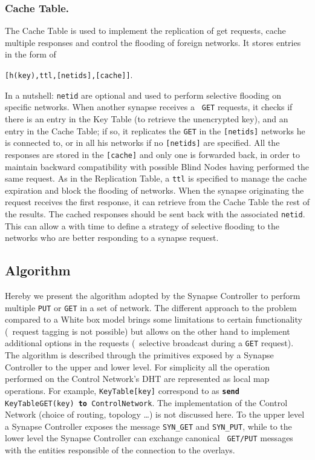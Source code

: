 \subsubsection{Cache Table.}
%
The Cache Table is used to implement the replication of get requests,
cache multiple responses and control the flooding of foreign networks.
It stores entries in the form of
%
\begin{center} 
{\tt[h(key),ttl,[netids],[cache]]}.
\end{center}
%
In a nutshell: {\tt netid} are optional and used to perform selective
flooding on specific networks.  When another synapse receives a {\tt
  GET} requests, it checks if there is an entry in the Key Table (to
retrieve the unencrypted key), and an entry in the Cache Table; if so,
it replicates the {\tt GET} in the {\tt [netids]} networks he is
connected to, or in all his networks if no {\tt [netids]} are
specified. All the responses are stored in the {\tt [cache]} and only
one is forwarded back, in order to maintain backward compatibility
with possible Blind Nodes having performed the same request. As in the
Replication Table, a {\tt ttl} is specified to manage the cache
expiration and block the flooding of networks.  When the synapse
originating the request receives the first response, it can retrieve
from the Cache Table the rest of the results.  The cached responses
should be sent back with the associated {\tt netid}. This can allow a
with time to define a strategy of selective flooding to the networks
who are better responding to a synapse request.

\subsection{Algorithm}
%
Hereby we present the algorithm adopted by the Synapse Controller to
perform multiple {\tt PUT} or {\tt GET} in a set of network.  The
different approach to the problem compared to a White box model brings
some limitations to certain functionality (\eg\ request tagging is not
possible) but allows on the other hand to implement additional options
in the requests (\eg\ selective broadcast during a {\tt GET} request).
The algorithm is described through the primitives exposed by a Synapse
Controller to the upper and lower level.  For simplicity all the
operation performed on the Control Network's DHT are represented as
local map operations.  For example, {\tt KeyTable[key]} correspond to
as {\tt {\bf send} KeyTableGET(key) {\bf to} ControlNetwork}.  The
implementation of the Control Network (choice of routing, topology
\ldots) is not discussed here. To the upper level a Synapse Controller
exposes the message {\tt SYN\_GET} and {\tt SYN\_PUT}, while to the
lower level the Synapse Controller can exchange canonical {\tt
  GET/PUT} messages with the entities responsible of the connection to
the overlays.

